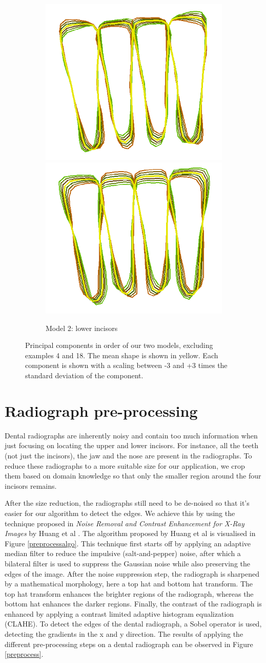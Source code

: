 \documentclass[a4paper,titlepage,12pt]{article}
\begin{document}
\begin{figure}
\begin{subfigure}{\linewidth}
		\includegraphics[width=0.19\linewidth]{shape/low_pca4}
		\includegraphics[width=0.19\linewidth]{shape/low_pca5}
		\caption{Model 2: lower incisors}
	\end{subfigure}
	\caption{Principal components in order of our two models, excluding examples 4 and 18. The mean shape is shown in yellow. Each component is shown with a scaling between -3 and +3 times the standard deviation of the component. }
	\label{fig:stdvar}
\end{figure}

\section{Radiograph pre-processing}
\label{sec:preproc}

Dental radiographs are inherently noisy and contain too much information when just focusing on locating the upper and lower incisors.
For instance, all the teeth (not just the incisors), the jaw and the nose are present in the radiographs.
To reduce these radiographs to a more suitable size for our application, we crop them based on domain knowledge so that only the smaller region around the four incisors remains.

After the size reduction, the radiographs still need to be de-noised so that it's easier for our algorithm to detect the edges.
We achieve this by using the technique proposed in \textit{Noise Removal and Contrast Enhancement for X-Ray Images} by Huang et al \cite{JBEMI1893}.
The algorithm proposed by Huang et al is visualised in Figure \ref{preprocessalgo}. This technique first starts off by applying an adaptive median filter to reduce the impulsive (salt-and-pepper) noise, after which a bilateral filter is used to suppress the Gaussian noise while also preserving the edges of the image.
After the noise suppression step, the radiograph is sharpened by a mathematical morphology, here a top hat and bottom hat transform.
The top hat transform enhances the brighter regions of the radiograph, whereas the bottom hat enhances the darker regions.
Finally, the contrast of the radiograph is enhanced by applying a contrast limited adaptive histogram equalization (CLAHE).
To detect the edges of the dental radiograph, a Sobel operator is used, detecting the gradients in the x and y direction.
The results of applying the different pre-processing steps on a dental radiograph can be observed in Figure \ref{preprocess}. 
\end{document}
